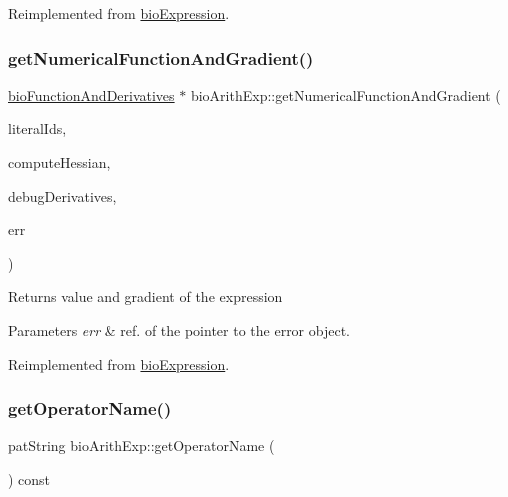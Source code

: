 Reimplemented from \hyperlink{classbio_expression_a3e4b4dca58dbbc6f0e411b30eb3f60b4}{bio\+Expression}.

\mbox{\label{classbio_arith_exp_ab470a2671ba4ed891cd13c621d197fe1}} 
\subsubsection{\texorpdfstring{get\+Numerical\+Function\+And\+Gradient()}{getNumericalFunctionAndGradient()}}
{\footnotesize\ttfamily \hyperlink{classbio_function_and_derivatives}{bio\+Function\+And\+Derivatives} $\ast$ bio\+Arith\+Exp\+::get\+Numerical\+Function\+And\+Gradient (\begin{DoxyParamCaption}\item[{vector$<$ pat\+U\+Long $>$}]{literal\+Ids,  }\item[{pat\+Boolean}]{compute\+Hessian,  }\item[{pat\+Boolean}]{debug\+Derivatives,  }\item[{pat\+Error $\ast$\&}]{err }\end{DoxyParamCaption})\hspace{0.3cm}{\ttfamily [virtual]}}

\begin{DoxyReturn}{Returns}
value and gradient of the expression 
\end{DoxyReturn}

\begin{DoxyParams}{Parameters}
{\em err} & ref. of the pointer to the error object. \\
\hline
\end{DoxyParams}


Reimplemented from \hyperlink{classbio_expression_a91c81ce80c9e972c913b10f5f3c1ed13}{bio\+Expression}.

\mbox{\label{classbio_arith_exp_a968d5d3d908d11da745e5c680ae981f9}} 
\subsubsection{\texorpdfstring{get\+Operator\+Name()}{getOperatorName()}}
{\footnotesize\ttfamily pat\+String bio\+Arith\+Exp\+::get\+Operator\+Name (\begin{DoxyParamCaption}{ }\end{DoxyParamCaption}) const\hspace{0.3cm}{\ttfamily [virtual]}}

